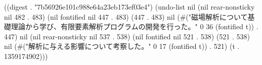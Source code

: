 
((digest . "7b56926e101c988e64a23eb173ef03e4") (undo-list nil (nil rear-nonsticky nil 482 . 483) (nil fontified nil 447 . 483) (447 . 483) nil (#("磁場解析について基礎理論から学び、有限要素解析プログラムの開発を行った。" 0 36 (fontified t)) . 447) nil (nil rear-nonsticky nil 537 . 538) (nil fontified nil 521 . 538) (521 . 538) nil (#("解析に与える影響について考察した。" 0 17 (fontified t)) . 521) (t . 1359174902)))
